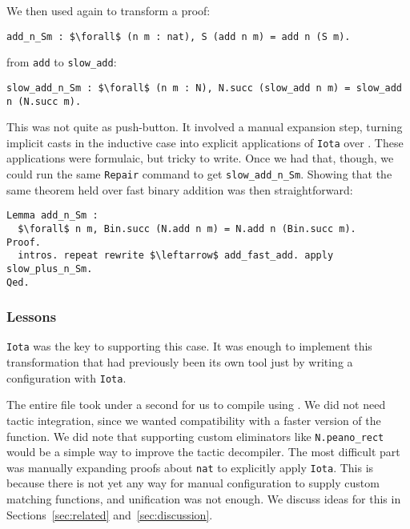 We then used \toolname again to transform a proof:
\begin{lstlisting}
add_n_Sm : $\forall$ (n m : nat), S (add n m) = add n (S m).
\end{lstlisting}
from \lstinline{add} to \lstinline{slow_add}:

\begin{lstlisting}[backgroundcolor=\color{cyan!30}]
slow_add_n_Sm : $\forall$ (n m : N), N.succ (slow_add n m) = slow_add n (N.succ m).
\end{lstlisting}
This was not quite as push-button.
It involved a manual expansion step, turning implicit casts in the inductive case
into explicit applications of \lstinline{Iota} over \A.
These applications were formulaic, but tricky to write.
Once we had that, though, we could run the same \lstinline{Repair} command
to get \lstinline{slow_add_n_Sm}.
Showing that the same theorem held over fast binary addition was then
straightforward:

\begin{lstlisting}
Lemma add_n_Sm :
  $\forall$ n m, Bin.succ (N.add n m) = N.add n (Bin.succ m).
Proof.
  intros. repeat rewrite $\leftarrow$ add_fast_add. apply slow_plus_n_Sm.
Qed.
\end{lstlisting}

\subsubsection{Lessons}

\lstinline{Iota} was the key to supporting this case.
It was enough to implement this transformation that had previously been its own tool
just by writing a configuration with \lstinline{Iota}. 

The entire file took under a second for us to compile using \toolname.
We did not need tactic integration, since we
wanted compatibility with a faster version of the function.
We did note that supporting custom eliminators like \lstinline{N.peano_rect} would be a simple way
to improve the tactic decompiler.
The most difficult part was manually expanding proofs about \lstinline{nat}
to explicitly apply \lstinline{Iota}.
This is because there is not yet any way for manual configuration to supply custom matching functions,
and unification was not enough.
We discuss ideas for this in Sections~\ref{sec:related} and~\ref{sec:discussion}. %


